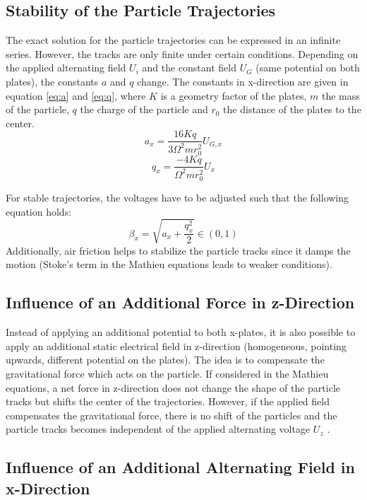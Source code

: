 \documentclass[
	paper=A4,
	parskip=full,
	chapterprefix=true,
	11pt,
	headings=normal,
	bibliography=totoc,
	listof=totoc,
	titlepage=on,
]{scrreprt}
\begin{document}
\subsection{Stability of the Particle Trajectories}
The exact solution for the particle trajectories can be expressed in an infinite series. However, the tracks are only finite under certain conditions. Depending on the applied alternating field $U_i$ and the constant field $U_{G}$ (same potential on both plates), the constants $a$ and $q$ change. The constants in x-direction are given in equation \ref{eq:a} and \ref{eq:q}, where $K$ is a geometry factor of the plates, $m$ the mass of the particle, $q$ the charge of the particle and $r_0$ the distance of the plates to the center.
\begin{equation}
	\label{eq:a}
	a_x=\frac{16 K q}{3 \Omega^2 m r_0^2} U_{G,x}
\end{equation}
\begin{equation}
	\label{eq:q}
	q_x= \frac{-4 K q}{ \Omega^2 m r_0^2} U_{x}
\end{equation}

For stable trajectories, the voltages have to be adjusted such that the following equation holds\cite{Lab_manual}:
\begin{equation}
 \beta_x  = \sqrt{a_x+\frac{q_x^2}{2}}  \in (0,1)
\end{equation}
Additionally, air friction helps to stabilize the particle tracks since it damps the motion (Stoke's term in the Mathieu equations leads to weaker conditions). 

\subsection{Influence of an Additional Force in z-Direction}
Instead of applying an additional potential to both x-plates, it is also possible to apply an additional static electrical field in z-direction (homogeneous, pointing upwards, different potential on the plates). The idea is to compensate the gravitational force which acts on the particle. If considered in the Mathieu equations, a net force in z-direction does not change the shape of the particle tracks but shifts the center of the trajectories. However, if the applied field compensates the gravitational force, there is no shift of the particles and the particle tracks becomes independent of the applied alternating voltage $U_z$ \cite{Lab_manual}.

\subsection{Influence of an Additional Alternating Field in x-Direction}
\end{document}
